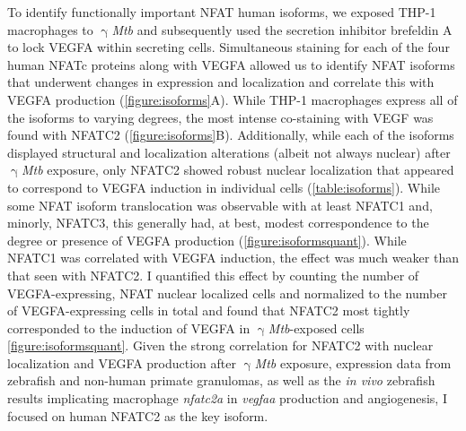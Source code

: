To identify functionally important NFAT human isoforms, we exposed THP\hyp{}1 macrophages to $\upgamma$\textit{Mtb} and subsequently used the secretion inhibitor brefeldin A to lock VEGFA within secreting cells. Simultaneous staining for each of the four human NFATc proteins along with VEGFA allowed us to identify NFAT isoforms that underwent changes in expression and localization and correlate this with VEGFA production (\autoref{figure:isoforms}A). While THP\hyp{}1 macrophages express all of the isoforms to varying degrees, the most intense co\hyp{}staining with VEGF was found with NFATC2 (\autoref{figure:isoforms}B). Additionally, while each of the isoforms displayed structural and localization alterations (albeit not always nuclear) after $\upgamma$\textit{Mtb} exposure, only NFATC2 showed robust nuclear localization that appeared to correspond to VEGFA induction in individual cells (\autoref{table:isoforms}). While some NFAT isoform translocation was observable with at least NFATC1 and, minorly, NFATC3, this generally had, at best, modest correspondence to the degree or presence of VEGFA production (\autoref{figure:isoformsquant}). While NFATC1 was correlated with VEGFA induction, the effect was much weaker than that seen with NFATC2. I quantified this effect by counting the number of VEGFA\hyp{}expressing, NFAT nuclear localized cells and normalized to the number of VEGFA\hyp{}expressing cells in total and found that NFATC2 most tightly corresponded to the induction of VEGFA in $\upgamma$\textit{Mtb}\hyp{}exposed cells \autoref{figure:isoformsquant}. Given the strong correlation for NFATC2 with nuclear localization and VEGFA production after $\upgamma$\textit{Mtb} exposure, expression data from zebrafish and non\hyp{}human primate granulomas, as well as the \textit{in vivo} zebrafish results implicating macrophage \textit{nfatc2a} in \textit{vegfaa} production and angiogenesis, I focused on human NFATC2 as the key isoform.

\singlespacing

